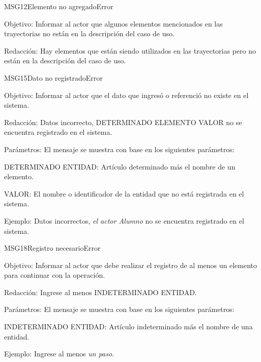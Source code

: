 \begin{mensaje}{MSG12}{Elemento no agregado}{Error}
    \item[Objetivo:] Informar al actor que algunos elementos mencionados en las trayectorias no están en la descripción del caso de uso.
    \item[Redacción:] Hay elementos que están siendo utilizados en las trayectorias pero no están en la descripción del caso de uso.
\end{mensaje}
\begin{mensaje}{MSG15}{Dato no registrado}{Error}
    \item[Objetivo:] Informar al actor que el dato que ingresó o referenció no existe en el sistema.
    \item[Redacción:] Datos incorrecto, DETERMINADO ELEMENTO VALOR no se encuentra registrado en el sistema.
    \item[Parámetros:] El mensaje se muestra con base en los siguientes parámetros:
    \begin{Citemize}
	\item DETERMINADO ENTIDAD: Artículo determinado más el nombre de un elemento.
	\item VALOR: El nombre o identificador de la entidad que no está registrada en el sistema.
    \end{Citemize}
    \item[Ejemplo:] Datos incorrectos, { \em el actor Alumno} no se encuentra registrado en el sistema.
\end{mensaje}
\begin{mensaje}{MSG18}{Registro necesario}{Error}
    \item[Objetivo:] Informar al actor que debe realizar el registro de al menos un elemento para continuar con la operación.
    \item[Redacción:] Ingrese al menos INDETERMINADO ENTIDAD.
    \item[Parámetros:] El mensaje se muestra con base en los siguientes parámetros:
    \begin{Citemize}
	\item INDETERMINADO ENTIDAD: Artículo indeterminado más el nombre de una entidad.
    \end{Citemize}
    \item[Ejemplo:] Ingrese al menos {\em un paso}.
\end{mensaje}
